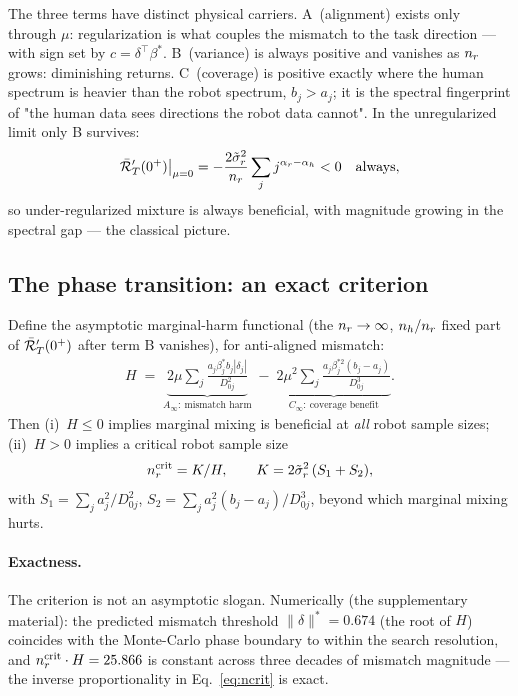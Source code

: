 The three terms have distinct physical carriers.
A~(alignment) exists only through $\mu$: regularization is what couples the mismatch to the task direction --- with sign set by $c = \delta^\top\beta^*$.
B~(variance) is always positive and vanishes as $n_r$ grows: diminishing returns.
C~(coverage) is positive exactly where the human spectrum is heavier than the robot spectrum, $b_j > a_j$; it is the spectral fingerprint of "the human data sees directions the robot data cannot".
In the unregularized limit only B survives:
\begin{equation}
  \bar{\mathcal{R}}_T'(0^+)\big|_{\mu=0} = -\frac{2\tilde\sigma_r^2}{n_r}\sum_j j^{\alpha_r - \alpha_h} < 0
  \quad\text{always},
  \label{eq:mu0}
\end{equation}
so under-regularized mixture is always beneficial, with magnitude growing in the spectral gap --- the classical picture.

\subsection{The phase transition: an exact criterion}

\begin{theorem}\label{thm:h}
Define the asymptotic marginal-harm functional (the $n_r\to\infty$, $n_h/n_r$ fixed part of $\bar{\mathcal{R}}_T'(0^+)$ after term B vanishes), for anti-aligned mismatch:
\begin{align}
  H \;=\; \underbrace{2\mu \sum_j \frac{a_j \beta^*_j b_j |\delta_j|}{D_{0j}^2}}_{A_\infty:\ \text{mismatch harm}}
  \;-\; \underbrace{2\mu^2 \sum_j \frac{a_j \beta_j^{*2} (b_j - a_j)}{D_{0j}^3}}_{C_\infty:\ \text{coverage benefit}} .
  \label{eq:h}
\end{align}
Then (i)~$H \le 0$ implies marginal mixing is beneficial at \emph{all} robot sample sizes;
(ii)~$H > 0$ implies a critical robot sample size
\begin{equation}
  n_r^{\mathrm{crit}} = K / H,
  \qquad
  K = 2\tilde\sigma_r^2\,(S_1 + S_2),
  \label{eq:ncrit}
\end{equation}
with $S_1 = \sum_j a_j^2/D_{0j}^2$, $S_2 = \sum_j a_j^2(b_j - a_j)/D_{0j}^3$, beyond which marginal mixing hurts.
\end{theorem}

\paragraph{Exactness.}
The criterion is not an asymptotic slogan.
Numerically (the supplementary material): the predicted mismatch threshold $\|\delta\|^* = 0.674$ (the root of $H$) coincides with the Monte-Carlo phase boundary to within the search resolution, and $n_r^{\mathrm{crit}} \cdot H = 25.866$ is constant across three decades of mismatch magnitude --- the inverse proportionality in Eq.~\eqref{eq:ncrit} is exact.

